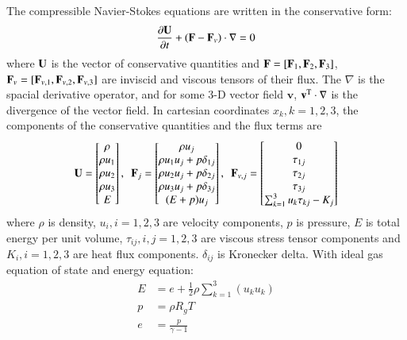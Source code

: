 The compressible Navier-Stokes equations are
written in the conservative form:
\begin{equation}
    \label{eq:NS}
    \frac{\partial \mathbf{U}}{\partial t} +
    (\mathbf{F} - \mathbf{F}_v) \cdot \mathbf\nabla = 0
\end{equation}
where $\mathbf{U}$ is the vector of conservative quantities and
$\mathbf{F}=[\mathbf{F}_1,\mathbf{F}_2,\mathbf{F}_3]$,
$\mathbf{F}_v=[\mathbf{F}_{v,1},\mathbf{F}_{v,2},\mathbf{F}_{v,3}]$
are
inviscid and viscous tensors of
their flux.
The $\nabla$ is the spacial derivative operator, and for
some 3-D vector field $\mathbf{v}$, $\mathbf{v}^\mathrm{T} \cdot \nabla$
is the divergence of the vector field.
In cartesian coordinates $x_k, k=1,2,3$, the components of
the conservative quantities and the flux terms are
\begin{equation}
    \mathbf{U} = \begin{bmatrix}
        \rho \\ \rho u_1 \\ \rho u_2 \\ \rho u_3 \\ E
    \end{bmatrix},\ \
    \mathbf{F}_j = \begin{bmatrix}
        \rho u_j                   \\
        \rho u_1u_j + p\delta_{1j} \\
        \rho u_2u_j + p\delta_{2j} \\
        \rho u_3u_j + p\delta_{3j} \\
        (E+p)u_j                   \\
    \end{bmatrix},\ \
    \mathbf{F}_{v,j} = \begin{bmatrix}
        0                                \\
        \tau_{1j}                        \\
        \tau_{2j}                        \\
        \tau_{3j}                        \\
        \sum_{k=1}^3{u_k\tau_{kj}} - K_j \\
    \end{bmatrix}
\end{equation}
where $\rho$ is density,
$u_i, i=1,2,3$ are velocity components,
$p$ is pressure,
$E$ is total energy per unit volume,
$\tau_{ij}, i,j=1,2,3$ are viscous stress tensor components
and
$K_i, i=1,2,3$ are heat flux components.
$\delta_{ij}$ is
Kronecker delta.
With ideal gas equation of state and energy equation:
\begin{equation}
    \begin{aligned}
        E & = e + \frac{1}{2}\rho\sum_{k=1}^{3}(u_ku_k) \\
        p & =\rho R_g T                                 \\
        e & = \frac{p}{\gamma - 1}
    \end{aligned}
\end{equation}
